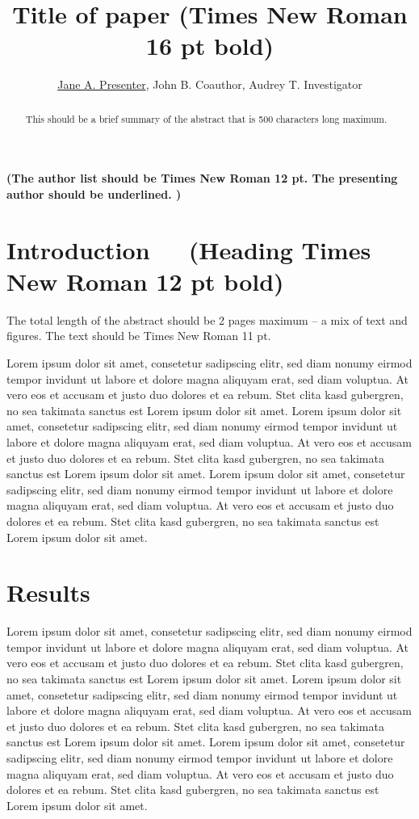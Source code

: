 \documentclass{itqwconf}
\title{Title of paper (Times New Roman 16 pt bold)}
\author{\underline{Jane A. Presenter}\authormark{1*},
  John B. Coauthor\authormark{1},
  Audrey T. Investigator\authormark{1}}
\affil[1]{Department of Electrical Engineering,
  University of California Los Angeles (UCLA) Los Angeles, CA 90095,
  USA~~~(10 pt. Times New Roman)}
\begin{document}
\maketitle

{
  \large
  \textbf{(The author list should be Times New Roman 12 pt. The presenting
    author should be underlined. )}
  \vskip12pt
}

\begin{abstract}
  This should be a brief summary of the abstract that is 500 characters long
  maximum.
\end{abstract}

\section{Introduction~~~(Heading Times New Roman 12 pt bold)}

The total length of the abstract should be 2 pages maximum -- a mix of text
and figures. The text should be Times New Roman 11 pt.

Lorem ipsum dolor sit amet, consetetur sadipscing elitr, sed diam nonumy
eirmod tempor invidunt ut labore et dolore magna aliquyam erat, sed diam
voluptua. At vero eos et accusam et justo duo dolores et ea rebum. Stet clita
kasd gubergren, no sea takimata sanctus est Lorem ipsum dolor sit amet. Lorem
ipsum dolor sit amet, consetetur sadipscing elitr, sed diam nonumy eirmod
tempor invidunt ut labore et dolore magna aliquyam erat, sed diam voluptua.
At vero eos et accusam et justo duo dolores et ea rebum. Stet clita kasd
gubergren, no sea takimata sanctus est Lorem ipsum dolor sit amet. Lorem
ipsum dolor sit amet, consetetur sadipscing elitr, sed diam nonumy eirmod
tempor invidunt ut labore et dolore magna aliquyam erat, sed diam voluptua.
At vero eos et accusam et justo duo dolores et ea rebum. Stet clita kasd
gubergren, no sea takimata sanctus est Lorem ipsum dolor sit amet.

\section{Results}

Lorem ipsum dolor sit amet, consetetur sadipscing elitr, sed diam nonumy
eirmod tempor invidunt ut labore et dolore magna aliquyam erat, sed diam
voluptua. At vero eos et accusam et justo duo dolores et ea rebum. Stet clita
kasd gubergren, no sea takimata sanctus est Lorem ipsum dolor sit amet. Lorem
ipsum dolor sit amet, consetetur sadipscing elitr, sed diam nonumy eirmod
tempor invidunt ut labore et dolore magna aliquyam erat, sed diam voluptua.
At vero eos et accusam et justo duo dolores et ea rebum. Stet clita kasd
gubergren, no sea takimata sanctus est Lorem ipsum dolor sit amet. Lorem
ipsum dolor sit amet, consetetur sadipscing elitr, sed diam nonumy eirmod
tempor invidunt ut labore et dolore magna aliquyam erat, sed diam voluptua.
At vero eos et accusam et justo duo dolores et ea rebum. Stet clita kasd
gubergren, no sea takimata sanctus est Lorem ipsum dolor sit amet.
\end{document}
